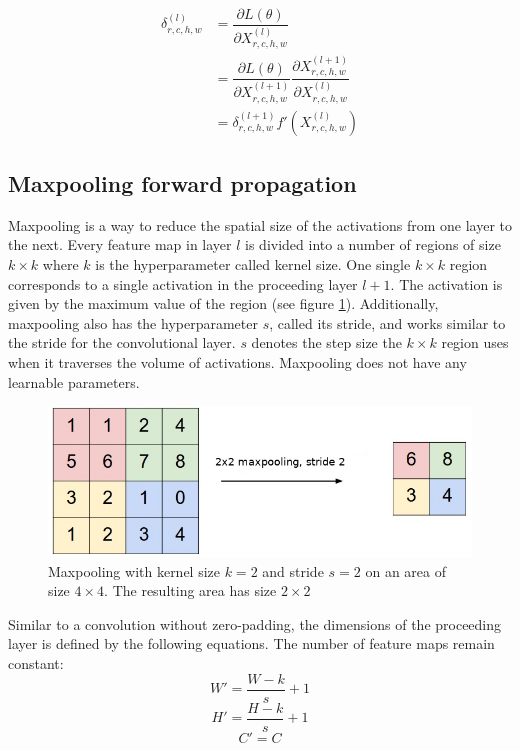 \documentclass[a4paper, twoside]{article}
\newcommand*{\pd}[2]{\ensuremath{\dfrac{\partial #1}{\partial #2}}}
\begin{document}
\begin{equation}
\begin{split}
\delta^{(l)}_{r,c,h,w}
		& = \pd{L(\theta)}{X^{(l)}_{r,c,h,w}} \\
		& = \pd{L(\theta)}{X^{(l+1)}_{r,c,h,w}} \pd{X^{(l+1)}_{r,c,h,w}}{X^{(l)}_{r,c,h,w}} \\
		& = \delta^{(l+1)}_{r,c,h,w} f'(X^{(l)}_{r,c,h,w})
\end{split}
\end{equation}

\subsection{Maxpooling forward propagation}
Maxpooling is a way to reduce the spatial size of the activations from one layer to the next. Every feature map in layer $l$ is divided into a number of regions of size $k \times k$ where $k$ is the hyperparameter called kernel size. One single $k \times k$ region corresponds to a single activation in the proceeding layer $l+1$. The activation is given by the maximum value of the region (see figure \ref{figmaxpool}). Additionally, maxpooling also has the hyperparameter $s$, called its stride, and works similar to the stride for the convolutional layer. $s$ denotes the step size the $k \times k$ region uses when it traverses the volume of activations. Maxpooling does not have any learnable parameters. \cite{cs231n} \cite{convmath} \cite{convarithmetic}

\begin{figure}[h]
	\centering
  		\includegraphics[scale=0.7]{maxpool.png}
  	\caption{Maxpooling with kernel size $k=2$ and stride $s=2$ on an area of size $4 \times 4$. The resulting area has size $2 \times 2$ \cite{figkonv}} \label{figmaxpool}
\end{figure}

Similar to a convolution without zero-padding, the dimensions of the proceeding layer is defined by the following equations. The number of feature maps remain constant: \cite{cs231n} \cite{convmath} \cite{convarithmetic}
\begin{equation}
W' = \frac{W-k}{s}+1
\end{equation}
\begin{equation}
H' = \frac{H-k}{s}+1
\end{equation}
\begin{equation}
C' = C
\end{equation}
\end{document}
